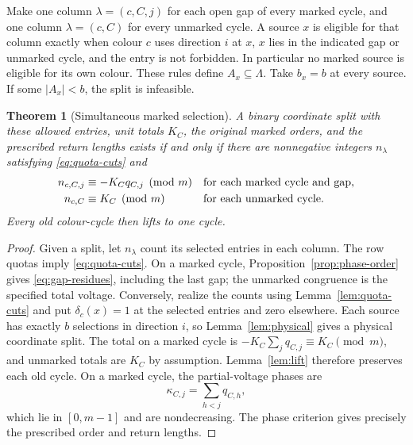 \documentclass[11pt,reqno]{amsart}
\numberwithin{equation}{section}
\newtheorem{theorem}{Theorem}[section]
\theoremstyle{definition}
\theoremstyle{remark}
\begin{document}
Make one column $\lambda=(c,C,j)$ for each open gap of every marked
cycle, and one column $\lambda=(c,C)$ for every unmarked cycle.
A source $x$ is eligible for that column exactly when colour $c$ uses
direction $i$ at $x$, $x$ lies in the indicated gap or unmarked cycle,
and the entry is not forbidden. In particular no marked source is
eligible for its own colour. These rules define $A_x\subseteq\Lambda$.
Take $b_x=b$ at every source. If some $|A_x|<b$, the split is infeasible.

\begin{theorem}[Simultaneous marked selection]\label{thm:marked-cuts}
A binary coordinate split with these allowed entries, unit totals $K_C$,
the original marked orders, and the prescribed return lengths exists
if and only if there are nonnegative integers $n_\lambda$ satisfying
\eqref{eq:quota-cuts} and
\begin{align}
 n_{c,C,j}&\equiv -K_Cq_{C,j}\pmod m
       &&\text{for each marked cycle and gap},\label{eq:gap-residues}\\
 n_{c,C}&\equiv K_C\pmod m
       &&\text{for each unmarked cycle}.\notag
\end{align}
Every old colour-cycle then lifts to one cycle.
\end{theorem}
\begin{proof}
Given a split, let $n_\lambda$ count its selected entries in each column. The row quotas imply \eqref{eq:quota-cuts}.
On a marked cycle, Proposition~\ref{prop:phase-order} gives
\eqref{eq:gap-residues}, including the last gap; the unmarked congruence
is the specified total voltage.
Conversely, realize the counts using Lemma~\ref{lem:quota-cuts} and put
$\delta_c(x)=1$ at the selected entries and zero elsewhere.
Each source has exactly $b$ selections in direction $i$, so
Lemma~\ref{lem:physical} gives a physical coordinate split.
The total on a marked cycle is
$-K_C\sum_jq_{C,j}\equiv K_C\pmod m$, and unmarked totals are $K_C$
by assumption. Lemma~\ref{lem:lift} therefore preserves each old cycle.
On a marked cycle, the partial-voltage phases are
\[
 \kappa_{C,j}=\sum_{h<j}q_{C,h},
\]
which lie in $[0,m-1]$ and are nondecreasing. The phase criterion gives
precisely the prescribed order and return lengths.
\end{proof}
\end{document}
